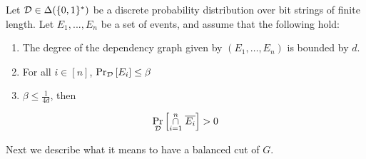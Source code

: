 \documentclass[11pt]{article}
\begin{document}
\begin{lemma}\label{lemma:lll}Let $\mathcal{D} \in \Delta(\{0,1\}^*)$ be a discrete probability distribution over bit strings of finite length.
  Let $E_1,...,E_n$ be a set of events, and assume that the following hold:
\begin{enumerate}
\item The degree of the dependency graph given by $(E_1, \dots, E_n)$ is bounded by $d$.

\item For all $i \in [n]$, $\Pr_{\mathcal{D}}\left[E_i \right] \leq \beta$

\item $\beta \leq \frac{1}{4d}$, then

\end{enumerate}

\[ \Pr_{\mathcal{D}}\left[\overset{n}{ \underset{i=1}{\cap}} \hspace{0.1cm}  \overline{E_i} \right] > 0\]


\end{lemma}

Next we describe what it means to have a balanced cut of $G$.

\end{document}
